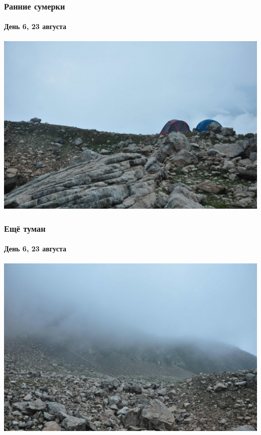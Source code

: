 \begin{frame}
	\frametitle{Ранние сумерки}
	\framesubtitle{День 6, 23 августа}
	\centering
	\includegraphics[width=\textwidth]{../pics/DSC_0094}			
\end{frame}

\begin{frame}
	\frametitle{Ещё туман}
	\framesubtitle{День 6, 23 августа}
	\centering
	\includegraphics[width=\textwidth]{../pics/DSC_0095}			
\end{frame} 

